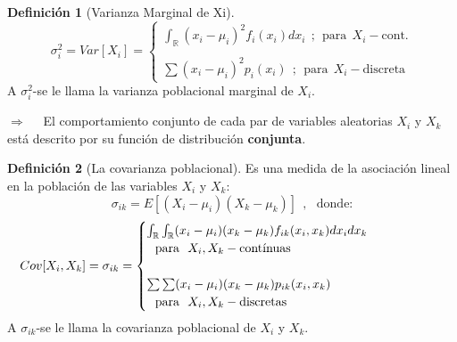 \documentclass[
]{book}
\theoremstyle{definition}
\newtheorem{definition}{Definición}[chapter]
\theoremstyle{definition}
\theoremstyle{definition}
\theoremstyle{definition}
\theoremstyle{remark}
\begin{document}
\begin{definition}[Varianza Marginal de Xi]
\protect\hypertarget{def:var-marginal}{}\label{def:var-marginal}\[
\sigma_i^2=Var[X_i]=\begin{cases}
\int_{\mathbb{R}}(x_{i}-\mu_i)^2f_{i}(x_{i})dx_{i} \ \ ; \ \ \text{para} \ \ X_{i}-\text{cont.}\\ \\
\sum (x_{i}-\mu_i)^2p_{i}(x_{i})\ \ ; \ \ \text{para} \ \ X_{i}-\text{discreta}
\end{cases}
\]
A \(\sigma_i^2\)-se le llama la varianza poblacional marginal de \(X_i\).

\(\Rightarrow\) ~~El comportamiento conjunto de cada par de variables
aleatorias \(X_i\) y \(X_k\) está descrito por su función de distribución
\textbf{conjunta}.
\end{definition}

\begin{definition}[La covarianza poblacional]
\protect\hypertarget{def:cov-pob}{}\label{def:cov-pob}Es una medida de la asociación
lineal en la población de las variables \(X_i\) y \(X_k\):
\[
\sigma_{ik}=E[(X_i-\mu_i)(X_k-\mu_k)] \ \ , \ \ \ \text{donde:}
\]
\vspace{-0.5cm} \[
    \hspace{-1.5cm} Cov[X_{i},X_k]=\sigma_{ik}=\begin{cases}
  \int_{\mathbb{R}}\int_{\mathbb{R}} (x_{i}-\mu_i)(x_{k}-\mu_k )f_{ik}(x_{i},x_k)dx_{i}dx_k \ \ \\ \ \ \text{para} \ \ X_{i},X_k-\text{contínuas}\\ \\
  \sum \sum (x_{i}-\mu_i)(x_k-\mu_k)p_{ik}(x_{i},x_k)\ \ \\ \ \ \text{para} \ \ X_{i},X_k-\text{discretas}
  \end{cases}
\]
A \(\sigma_{ik}\)-se le llama la covarianza poblacional de \(X_i\) y \(X_k\).
\end{definition}
\end{document}
